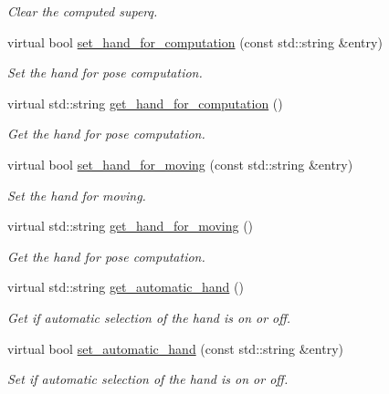 \begin{DoxyCompactItemize}
\begin{DoxyCompactList}\small\item\em Clear the computed superq. \end{DoxyCompactList}\item 
virtual bool \hyperlink{classgraspDemo__IDL_a68a1a97bb9c29769a3fc3c5c158bed0a}{set\+\_\+hand\+\_\+for\+\_\+computation} (const std\+::string \&entry)
\begin{DoxyCompactList}\small\item\em Set the hand for pose computation. \end{DoxyCompactList}\item 
virtual std\+::string \hyperlink{classgraspDemo__IDL_a68b2d4eaa388f71a5519580b56b906c7}{get\+\_\+hand\+\_\+for\+\_\+computation} ()
\begin{DoxyCompactList}\small\item\em Get the hand for pose computation. \end{DoxyCompactList}\item 
virtual bool \hyperlink{classgraspDemo__IDL_a23eeae69cf9067064b6757219abb334f}{set\+\_\+hand\+\_\+for\+\_\+moving} (const std\+::string \&entry)
\begin{DoxyCompactList}\small\item\em Set the hand for moving. \end{DoxyCompactList}\item 
virtual std\+::string \hyperlink{classgraspDemo__IDL_a702688abfa7858c4650cd22e4516665a}{get\+\_\+hand\+\_\+for\+\_\+moving} ()
\begin{DoxyCompactList}\small\item\em Get the hand for pose computation. \end{DoxyCompactList}\item 
virtual std\+::string \hyperlink{classgraspDemo__IDL_ab1ea4a6835cbd7a7eef2f347c11f7968}{get\+\_\+automatic\+\_\+hand} ()
\begin{DoxyCompactList}\small\item\em Get if automatic selection of the hand is on or off. \end{DoxyCompactList}\item 
virtual bool \hyperlink{classgraspDemo__IDL_a0be94184ab18c9d312fb7c2e27b3d04d}{set\+\_\+automatic\+\_\+hand} (const std\+::string \&entry)
\begin{DoxyCompactList}\small\item\em Set if automatic selection of the hand is on or off. \end{DoxyCompactList}\item 

\end{DoxyCompactItemize}
